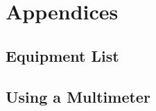 \documentclass[letterpaper,10pt,english]{sphinxmanual}
\begin{document}
\chapter{Appendices}
\label{\detokenize{appendices:appendices}}\label{\detokenize{appendices::doc}}

\section{Equipment List}
\label{\detokenize{appendices:equipment-list}}

\section{Using a Multimeter}
\label{\detokenize{appendices:using-a-multimeter}}


\renewcommand{\indexname}{Index}
\printindex
\end{document}
